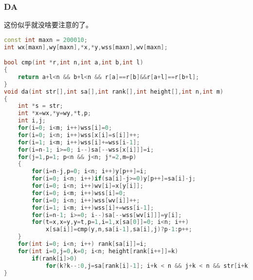     \subsubsection{DA}
        这份似乎就没啥要注意的了。
        \begin{lstlisting}[language=c++]
const int maxn = 200010;
int wx[maxn],wy[maxn],*x,*y,wss[maxn],wv[maxn];

bool cmp(int *r,int n,int a,int b,int l)
{
    return a+l<n && b+l<n && r[a]==r[b]&&r[a+l]==r[b+l];
}
void da(int str[],int sa[],int rank[],int height[],int n,int m)
{
    int *s = str;
    int *x=wx,*y=wy,*t,p;
    int i,j;
    for(i=0; i<m; i++)wss[i]=0;
    for(i=0; i<n; i++)wss[x[i]=s[i]]++;
    for(i=1; i<m; i++)wss[i]+=wss[i-1];
    for(i=n-1; i>=0; i--)sa[--wss[x[i]]]=i;
    for(j=1,p=1; p<n && j<n; j*=2,m=p)
    {
        for(i=n-j,p=0; i<n; i++)y[p++]=i;
        for(i=0; i<n; i++)if(sa[i]-j>=0)y[p++]=sa[i]-j;
        for(i=0; i<n; i++)wv[i]=x[y[i]];
        for(i=0; i<m; i++)wss[i]=0;
        for(i=0; i<n; i++)wss[wv[i]]++;
        for(i=1; i<m; i++)wss[i]+=wss[i-1];
        for(i=n-1; i>=0; i--)sa[--wss[wv[i]]]=y[i];
        for(t=x,x=y,y=t,p=1,i=1,x[sa[0]]=0; i<n; i++)
            x[sa[i]]=cmp(y,n,sa[i-1],sa[i],j)?p-1:p++;
    }
    for(int i=0; i<n; i++) rank[sa[i]]=i;
    for(int i=0,j=0,k=0; i<n; height[rank[i++]]=k)
        if(rank[i]>0)
            for(k?k--:0,j=sa[rank[i]-1]; i+k < n && j+k < n && str[i+k]==str[j+k]; k++);
}
        \end{lstlisting}